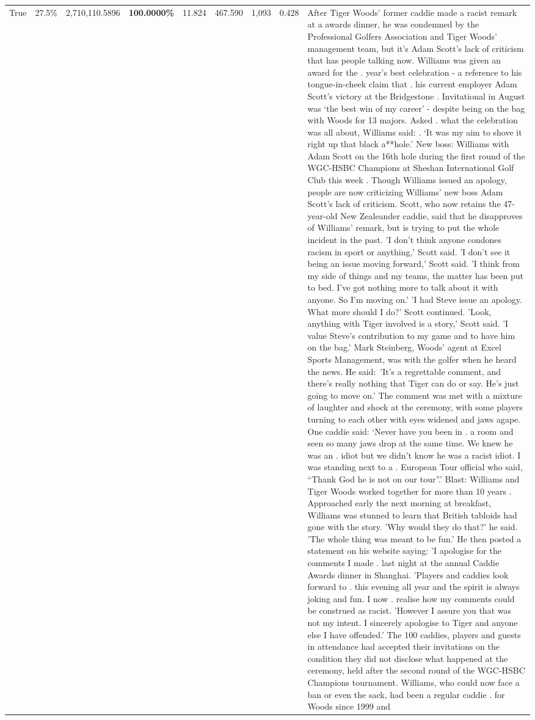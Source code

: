 \begin{table}[H]
\begin{tabular}{lllrlllll}
True & 27.5\% & 2,710,110.5896 & \bfseries \color{red} 100.0000\% & 11.824 & 467.590 & 1,093 & 0.428 & After Tiger Woods' former caddie made a racist remark at a awards dinner, he was condemned by the Professional Golfers Association and Tiger Woods' management team, but it's Adam Scott's lack of criticism that has people talking now. Williams was given an award for the . year’s best celebration - a reference to his tongue-in-cheek claim that . his current employer Adam Scott’s victory at the Bridgestone . Invitational in August was ‘the best win of my career’ - despite being on the bag with Woods for 13 majors. Asked . what the celebration was all about, Williams said: . ‘It was my aim to shove it right up that black a**hole.’ New boss: Williams with Adam Scott  on the 16th hole during the first round of the WGC-HSBC Champions at Sheshan International Golf Club this week . Though Williams issued an apology, people are now criticizing Williams' new boss Adam Scott's lack of criticism. Scott, who now retains the 47-year-old New Zealeander caddie, said that he disapproves of Williams' remark, but is trying to put the whole incident in the past. 'I don't think anyone condones racism in sport or anything,' Scott said. 'I don't see it being an issue moving forward,' Scott said. 'I think from my side of things and my teams, the matter has been put to bed. I've got nothing more to talk about it with anyone. So I'm moving on.' 'I had Steve issue an apology. What more should I do?' Scott continued. 'Look, anything with Tiger involved is a story,' Scott said. 'I value Steve's contribution to my game and to have him on the bag.' Mark Steinberg, Woods' agent at Excel Sports Management, was with the golfer when he heard the news. He said: 'It's a regrettable comment, and there's really nothing that Tiger can do or say. He's just going to move on.' The comment was met with a mixture of laughter and shock at the ceremony, with some players turning to each other with eyes widened and jaws agape. One caddie said: ‘Never have you been in . a room and seen so many jaws drop at the same time. We knew he was an . idiot but we didn’t know he was a racist idiot. I was standing next to a . European Tour official who said, “Thank God he is not on our tour”.’ Blast: Williams and Tiger Woods worked together for more than 10 years . Approached early the next morning at breakfast, Williams was stunned to learn that British tabloids had gone with the story. 'Why would they do that?' he said. 'The whole thing was meant to be fun.' He then posted a statement on his website saying: 'I apologise for the comments I made . last night at the annual Caddie Awards dinner in Shanghai. 'Players and caddies look forward to . this evening all year and the spirit is always joking and fun. I now . realise how my comments could be construed as racist. 'However I assure you that was not my intent. I sincerely apologise to Tiger and anyone else I have offended.' The 100 caddies, players and guests in attendance had accepted their invitations on the condition they did not disclose what happened at the ceremony, held after the second round of the WGC-HSBC Champions tournament. Williams, who could now face a ban or even the sack, had been a regular caddie . for Woods since 1999 and 
\end{tabular}
\end{table}
